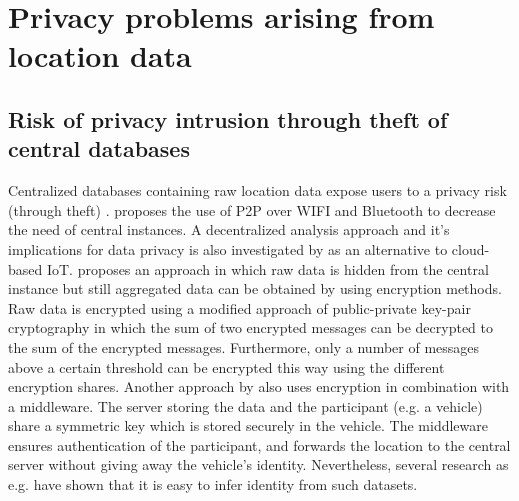 

\section{Privacy problems arising from location data}
\subsection{Risk of privacy intrusion through theft of central databases}
Centralized databases containing raw location data expose users to a privacy risk (through theft) \parencite{iot, hoh2006enhancing}. \parencite{p2p-android} proposes the use of P2P over WIFI and Bluetooth to decrease the need of central instances. A decentralized analysis approach and it's implications for data privacy is also investigated by \parencite{iot} as an alternative to cloud-based IoT.
\parencite{crowdsourcing} proposes an approach in which raw data is hidden from the central instance but still aggregated data can be obtained by using encryption methods. Raw data is encrypted using a modified approach of public-private key-pair cryptography in which the sum of two encrypted messages can be decrypted to the sum of the encrypted messages. Furthermore, only a number of messages above a certain threshold can be encrypted this way using the different encryption shares. 
Another approach by \parencite{hoh2006enhancing} also uses encryption in combination with a middleware. The server storing the data and the participant (e.g. a vehicle) share a symmetric key which is stored securely in the vehicle. The middleware ensures authentication of the participant, and forwards the location to the central server without giving away the vehicle's identity. Nevertheless, several research as e.g. \parencite{krumm, twitter, cellphone} have shown that it is easy to infer identity from such datasets. 

